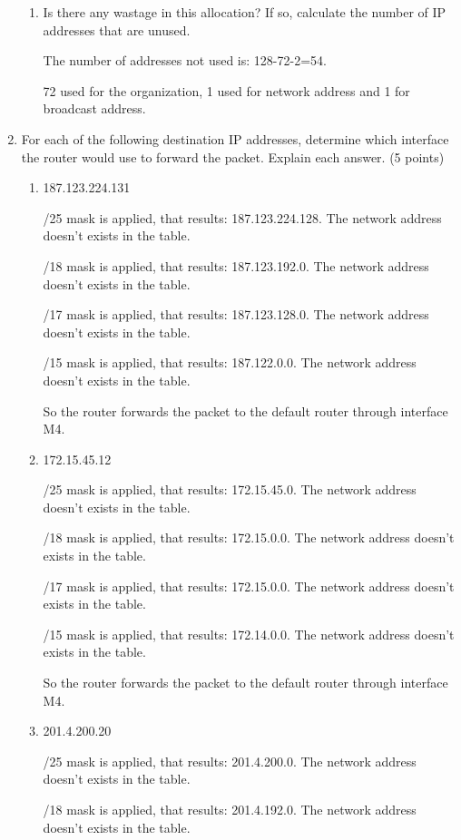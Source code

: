 \documentclass{article}
\begin{document}
\begin{enumerate}
\begin{enumerate}
    \item Is there any wastage in this allocation? If so, calculate the number of IP addresses that are unused.

    The number of addresses not used is: 128-72-2=54.

    72 used for the organization, 1 used for network address and 1 for broadcast address.
  \end{enumerate}

  \item For each of the following destination IP addresses, determine which interface the router would use to forward the packet. Explain each answer. (5 points)
  \begin{enumerate}
    \item 187.123.224.131

    /25 mask is applied, that results: 187.123.224.128. The network address doesn't exists in the table.

    /18 mask is applied, that results: 187.123.192.0. The network address doesn't exists in the table.

    /17 mask is applied, that results: 187.123.128.0. The network address doesn't exists in the table.

    /15 mask is applied, that results: 187.122.0.0. The network address doesn't exists in the table.

    So the router forwards the packet to the default router through interface M4.
    
    \item 172.15.45.12

    /25 mask is applied, that results: 172.15.45.0. The network address doesn't exists in the table.

    /18 mask is applied, that results: 172.15.0.0. The network address doesn't exists in the table.

    /17 mask is applied, that results: 172.15.0.0. The network address doesn't exists in the table.

    /15 mask is applied, that results: 172.14.0.0. The network address doesn't exists in the table.

    So the router forwards the packet to the default router through interface M4.

    \item 201.4.200.20

    /25 mask is applied, that results: 201.4.200.0. The network address doesn't exists in the table.

    /18 mask is applied, that results: 201.4.192.0. The network address doesn't exists in the table.


\end{enumerate}
\end{enumerate}
\end{document}
